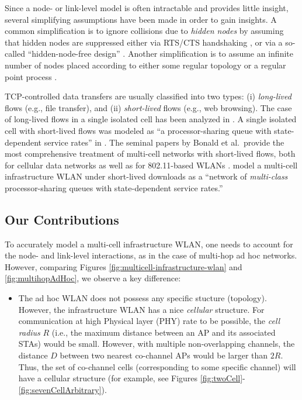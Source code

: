 \documentclass[10pt,a4paper,journal]{IEEEtran}
\theoremstyle{definition}
\theoremstyle{remark}
\theoremstyle{plain}
\begin{document}
Since a node- or link-level model is often intractable and provides little insight, several simplifying assumptions have been made in order to gain insights. A common simplification is to ignore collisions due to \textit{hidden nodes} by assuming that hidden nodes are suppressed either via RTS/CTS handshaking \cite{wanet.durvy09selfOrganization,wanet.bonald08multicellprocsharing}, or via a so-called ``hidden-node-free design'' \cite{wanet.jiang-liew08MobComp-HNEN,wanet.liew_etal09mobicom-capacity-wireless-networks,wanet.liew_etal09ICCback-of-the-envelope}. Another simplification is to assume an infinite number of nodes placed according to either some regular topology \cite{wanet.durvy09selfOrganization} or a regular point process \cite{wanet.nguyen07stochGeom}. 

TCP-controlled data transfers are usually classified into two types: (i) \textit{long-lived} flows (e.g., file transfer), and (ii) \textit{short-lived} flows (e.g., web browsing). The case of long-lived flows in a single isolated cell has been analyzed in \cite{wanet.harsha07WiNet,wanet.bruno08TCPeqvSatModel}. A single isolated cell with short-lived flows was modeled as ``a processor-sharing queue with state-dependent service rates'' in \cite{wanet.litjens_etalITC03integrated_packet_flow,wanet.miorandi_etal06http_over_wlans}. The seminal papers by Bonald et al.~provide the most comprehensive treatment of multi-cell networks with short-lived flows, both for cellular data networks \cite{wanet.bonald_etal04multicell-cellular} as well as for 802.11-based WLANs \cite{wanet.bonald08multicellprocsharing}. \cite{wanet.bonald08multicellprocsharing} model a multi-cell infrastructure WLAN under short-lived downloads as a ``network of \textit{multi-class} processor-sharing queues with state-dependent service rates.''




\subsection{Our Contributions} 

To accurately model a multi-cell infrastructure WLAN, one needs to account for the node- and link-level interactions, as in the case of multi-hop ad hoc networks. However, comparing Figures \ref{fig:multicell-infrastructure-wlan} and \ref{fig:multihopAdHoc}, we observe a key difference: 
\begin{itemize}
\item The ad hoc WLAN does not possess any specific stucture (topology). However, the infrastructure WLAN has a nice \textit{cellular} structure. For communication at high Physical layer (PHY) rate to be possible, the \textit{cell radius} $R$ (i.e., the maximum distance between an AP and its associated STAs) would be small. However, with multiple non-overlapping channels, the distance $D$ between two nearest co-channel APs would be larger than $2R$. Thus, the set of co-channel cells (corresponding to some specific channel) will have a cellular structure (for example, see Figures \ref{fig:twoCell}-\ref{fig:sevenCellArbitrary}). 
\end{itemize}
\end{document}
